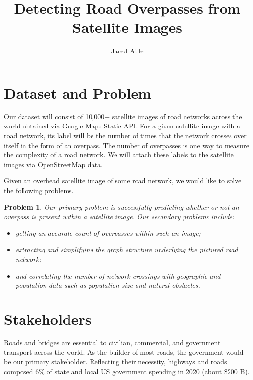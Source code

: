 \documentclass{article}
\newtheorem*{problem}{Problem}
\begin{document}
	

		\title{Detecting Road Overpasses from Satellite Images}
		\author{Jared Able}
		\date{}
\maketitle
		

	
	\section{Dataset and Problem}
	
	Our dataset will consist of 10,000+ satellite images of road networks across the world obtained via Google Maps Static API. For a given satellite image with a road network, its label will be the number of times that the network crosses over itself in the form of an overpass. The number of overpasses is one way to measure the complexity of a road network. We will attach these labels to the satellite images via OpenStreetMap data. 
	
	Given an overhead satellite image of some road network, we would like to solve the following problems.
	
	\begin{problem}
			Our primary problem is successfully predicting whether or not an overpass is present within a satellite image. Our secondary problems include:
			\begin{itemize}
				\item getting an accurate count of overpasses within such an image;
				\item extracting and simplifying the graph structure underlying the pictured road network;
				\item and correlating the number of network crossings with geographic and population data such as population size and natural obstacles.
			\end{itemize}
		\end{problem}
		
		

	
	\section{Stakeholders}
	
	Roads and bridges are essential to civilian, commercial, and government transport across the world. As the builder of most roads, the government would be our primary stakeholder. Reflecting their necessity, highways and roads composed 6\% of state and local US government spending in 2020 (about \$200 B). 
	
\end{document}
